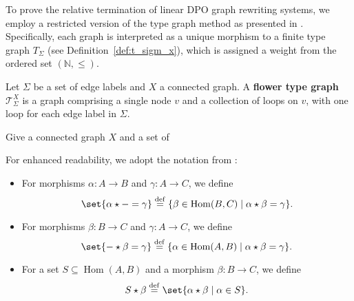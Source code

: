 To prove the relative termination of linear DPO graph rewriting systems, we employ a restricted version of the type graph method as presented in \cite{endrullis2023generalized}. Specifically, each graph is interpreted as a unique morphism to a finite type graph \( T_\Sigma \) (see Definition~\ref{def:t_sigm_x}), which is assigned a weight from the ordered set \((\mathbb{N}, \leq)\).

\begin{definition}
    \label{def:t_sigm_x}
    Let $\Sigma$ be a set of edge labels and \( X \) a connected graph.
    A \textbf{flower type graph} \( \mathcal{T}_\Sigma^X \) is a graph comprising a single node \( v \) and a collection of loops on \( v \), with one loop for each edge label in \( \Sigma \).
\end{definition}
Give a connected graph $X$ and a set of 

\begin{remark}[Notation]
    For enhanced readability, we adopt the notation from \cite[Notation 3.3]{endrullis2023generalized}:
    \begin{itemize}
        \item For morphisms \( \alpha : A \to B \) and \( \gamma : A \to C \), we define
        \[
            \set{ \alpha \star - = \gamma } \overset{\operatorname{def}}{=} \{ \beta \in \operatorname{Hom}(B, C) \mid \alpha \star \beta = \gamma \}.
        \]
        \item For morphisms \( \beta : B \to C \) and \( \gamma : A \to C \), we define
        \[
            \set{ - \star \beta = \gamma } \overset{\operatorname{def}}{=} \{ \alpha \in \operatorname{Hom}(A, B) \mid \alpha \star \beta = \gamma \}.
        \]
        \item For a set \( S \subseteq \operatorname{Hom}(A, B) \) and a morphism \( \beta : B \to C \), we define
        \[
            S \star \beta \overset{\operatorname{def}}{=} \set{ \alpha \star \beta \mid \alpha \in S }.
        \]
    \end{itemize}
\end{remark}

